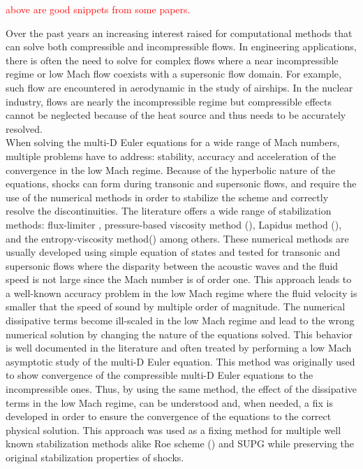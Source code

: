 \documentclass[preprint,10pt]{elsarticle}
\newcommand{\tcr}[1]{\textcolor{red}{#1}}
\begin{document}
\tcr{above are good snippets from some papers.}

Over the past years an increasing interest raised for computational methods that can solve both compressible and incompressible flows. In engineering applications, there is often the need to solve for complex flows where a near incompressible regime or low Mach flow coexists with a supersonic flow domain. For example, such flow are encountered in aerodynamic in the study of airships. In the nuclear industry, flows are nearly the incompressible regime but compressible effects cannot be neglected because of the heat source and thus needs to be accurately resolved. \\
When solving the multi-D Euler equations for a wide range of Mach numbers, multiple problems have to address: stability, accuracy and acceleration of the convergence in the low Mach regime. Because of the hyperbolic nature of the equations, shocks can form during transonic and supersonic flows, and require the use of the numerical methods in order to stabilize the scheme and correctly resolve the discontinuities. The literature offers a wide range of stabilization methods: flux-limiter \cite{FluxLimiter, FluxLimiter2}, pressure-based viscosity method (\cite{PBV_book}), Lapidus method (\cite{Lapidus_paper, LMP, Lapidus_book}), and the entropy-viscosity method(\cite{jlg1, jlg2}) among others. These numerical methods are usually developed using simple equation of states and tested for transonic and supersonic flows where the disparity between the acoustic waves and the fluid speed is not large since the Mach number is of order one. This approach leads to a well-known accuracy problem in the low Mach regime where the fluid velocity is smaller that the speed of sound by multiple order of magnitude. The numerical dissipative terms become ill-scaled in the low Mach regime and lead to the wrong numerical solution by changing the nature of the equations solved. This behavior is well documented in the literature \cite{LowMach1, LowMach2, LowMach3} and often treated by performing a low Mach asymptotic study of the multi-D Euler equation. This method was originally used \cite{LowMach1} to show convergence of the compressible multi-D Euler equations to the incompressible ones. Thus, by using the same method, the effect of the dissipative terms in the low Mach regime, can be understood and, when needed, a fix is developed in order to ensure the convergence of the equations to the correct physical solution. This approach was used as a fixing method for multiple well known stabilization methods alike Roe scheme (\cite{Roe}) and SUPG \cite{LowMach3} while preserving the original stabilization properties of shocks.  \\
\end{document}

